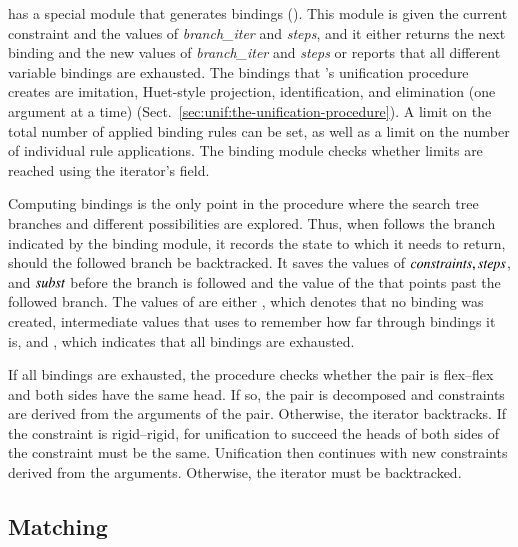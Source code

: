 \ehohii{} has a special module that generates bindings (). This
module is given the current constraint and the values of \emph{branch\_iter} and
\emph{steps}, and it either returns the next binding and the new values of
\emph{branch\_iter} and \emph{steps} or reports that all different variable
bindings are exhausted. The bindings that \ehohii{}'s unification procedure creates
are imitation, Huet-style projection, identification, and elimination (one
argument at a time) (Sect.~\ref{sec:unif:the-unification-procedure}). A limit on the
total number of applied binding rules can be set, as well as a limit on the
number of individual rule applications. The binding module checks whether limits
are reached using the iterator's  field.

Computing bindings is the only point in the procedure where the search tree
branches and different possibilities are explored. Thus, when \ehohii{} follows
the branch indicated by the binding module, it records the state to which it
needs to return, should the followed branch be backtracked. It saves the values
of $\mathit{constraints}, \mathit{steps}$, and $\mathit{subst}$ before the branch is followed
and the value of the  that points past the followed branch. The
values of  are either , which denotes that no
binding was created, intermediate values that  uses to remember
how far through bindings it is, and , which indicates that all
bindings are exhausted.

If all bindings are exhausted, the procedure checks whether the pair is
flex--flex and both sides have the same head. If so, the pair is decomposed and
constraints are derived from the arguments of the pair. Otherwise, the iterator
backtracks.
%
If the constraint is rigid--rigid, for unification to succeed the heads of both
sides of the constraint must be the same. Unification then continues
with new constraints derived from the arguments. Otherwise, the iterator must be
backtracked.

\subsection{Matching} 

